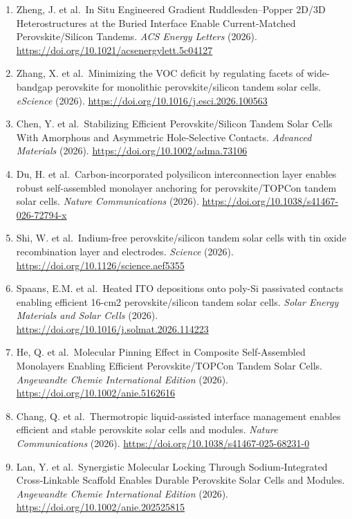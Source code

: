 \documentclass[
  11pt,
]{article}
\begin{document}
\begin{enumerate}
  \emph{Nano-Micro Letters} (2026).
  \url{https://doi.org/10.1007/s40820-025-01962-3}
\item
  Zheng, J. et al.~In Situ Engineered Gradient Ruddlesden--Popper 2D/3D
  Heterostructures at the Buried Interface Enable Current-Matched
  Perovskite/Silicon Tandems. \emph{ACS Energy Letters} (2026).
  \url{https://doi.org/10.1021/acsenergylett.5c04127}
\item
  Zhang, X. et al.~Minimizing the VOC deficit by regulating facets of
  wide-bandgap perovskite for monolithic perovskite/silicon tandem solar
  cells. \emph{eScience} (2026).
  \url{https://doi.org/10.1016/j.esci.2026.100563}
\item
  Chen, Y. et al.~Stabilizing Efficient Perovskite/Silicon Tandem Solar
  Cells With Amorphous and Asymmetric Hole‐Selective Contacts.
  \emph{Advanced Materials} (2026).
  \url{https://doi.org/10.1002/adma.73106}
\item
  Du, H. et al.~Carbon-incorporated polysilicon interconnection layer
  enables robust self-assembled monolayer anchoring for
  perovskite/TOPCon tandem solar cells. \emph{Nature Communications}
  (2026). \url{https://doi.org/10.1038/s41467-026-72794-x}
\item
  Shi, W. et al.~Indium-free perovskite/silicon tandem solar cells with
  tin oxide recombination layer and electrodes. \emph{Science} (2026).
  \url{https://doi.org/10.1126/science.aef5355}
\item
  Spaans, E.M. et al.~Heated ITO depositions onto poly-Si passivated
  contacts enabling efficient 16-cm2 perovskite/silicon tandem solar
  cells. \emph{Solar Energy Materials and Solar Cells} (2026).
  \url{https://doi.org/10.1016/j.solmat.2026.114223}
\item
  He, Q. et al.~Molecular Pinning Effect in Composite Self‐Assembled
  Monolayers Enabling Efficient Perovskite/TOPCon Tandem Solar Cells.
  \emph{Angewandte Chemie International Edition} (2026).
  \url{https://doi.org/10.1002/anie.5162616}
\item
  Chang, Q. et al.~Thermotropic liquid-assisted interface management
  enables efficient and stable perovskite solar cells and modules.
  \emph{Nature Communications} (2026).
  \url{https://doi.org/10.1038/s41467-025-68231-0}
\item
  Lan, Y. et al.~Synergistic Molecular Locking Through Sodium‐Integrated
  Cross‐Linkable Scaffold Enables Durable Perovskite Solar Cells and
  Modules. \emph{Angewandte Chemie International Edition} (2026).
  \url{https://doi.org/10.1002/anie.202525815}

\end{enumerate}
\end{document}
